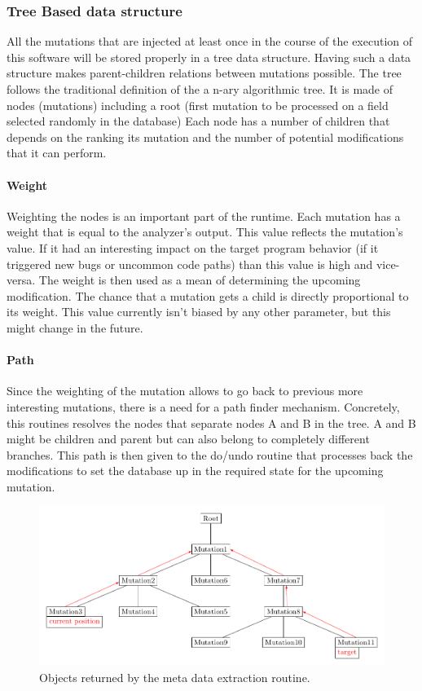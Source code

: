 \documentclass{article}
\begin{document}
\begin{empfile}
			\subsubsection{Tree Based data structure}
All the mutations that are injected at least once in the course of the execution of this software will be stored properly in a tree data structure. Having such a data structure makes parent-children relations between mutations possible. The tree follows the traditional definition of the a n-ary algorithmic tree.
It is made of nodes (mutations) including a root (first mutation to be processed on a field selected randomly in the database)  
Each node has a number of children that depends on the ranking its mutation and the number of potential modifications that it can perform.
				\paragraph{Weight}
Weighting the nodes is an important part of the runtime. Each mutation has a weight that is equal to the analyzer's output. This value reflects the mutation's value. If it had an interesting impact on the target program behavior (if it triggered new bugs or uncommon code paths) than this value is high and vice-versa. The weight is then used as a mean of determining the upcoming modification. The chance that a mutation gets a child is directly proportional to its weight.
This value currently isn't biased by any other parameter, but this might change in the future.  
				\paragraph{Path} %
Since the weighting of the mutation allows to go back to previous more interesting mutations, 
there is a need for a path finder mechanism. Concretely, this routines resolves the nodes that separate nodes A and B in the tree. A and B might be children and parent but can also belong to completely different branches. This path is then given to the do/undo routine that processes back the modifications to set the database up in the required state for the upcoming mutation. 

\bigskip

\begin{figure}[h!] 
\centering
\includegraphics[width=\textwidth]{CommonAncestorDiagram.pdf}
\caption{Objects returned by the meta data extraction routine.}
\end{figure}


\end{empfile}
\end{document}
